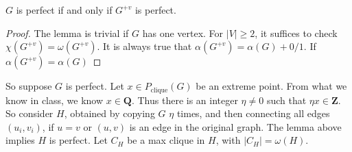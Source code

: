 \begin{lemma}
    $G$ is perfect if and only if $G^{+v}$ is perfect.
\end{lemma}
\begin{proof}
    The lemma is trivial if $G$ has one vertex. For $|V| \geq 2$, it suffices to check $\chi(G^{+v}) = \omega(G^{+v})$. It is always true that $\alpha(G^{+v}) = \alpha(G) + 0/1$. If $\alpha(G^{+v}) = \alpha(G)$
\end{proof}

So suppose $G$ is perfect. Let $x \in P_{\text{clique}}(G)$ be an extreme point. From what we know in class, we know $x \in \mathbf{Q}$. Thus there is an integer $\eta \neq 0$ such that $\eta x \in \mathbf{Z}$. So consider $H$, obtained by copying $G$ $\eta$ times, and then connecting all edges $(u_i,v_i)$, if $u = v$ or $(u,v)$ is an edge in the original graph. The lemma above implies $H$ is perfect. Let $C_H$ be a max clique in $H$, with $|C_H| = \omega(H)$.

